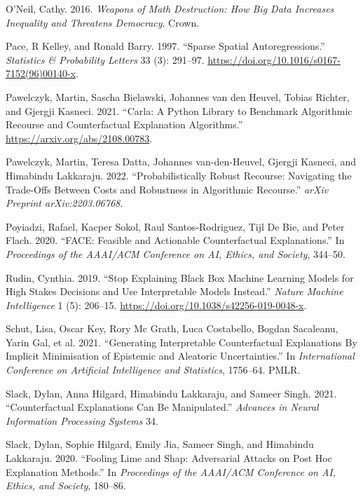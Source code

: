 \documentclass{juliacon}
\newlength{\cslhangindent}
\newenvironment{CSLReferences}[2] %
 {\begin{list}{}{%
  \setlength{\itemindent}{0pt}
  \setlength{\leftmargin}{0pt}
  \setlength{\parsep}{0pt}
  \ifodd #1
   \setlength{\leftmargin}{\cslhangindent}
   \setlength{\itemindent}{-1\cslhangindent}
  \fi
  \setlength{\itemsep}{#2\baselineskip}}}
 {\end{list}}
\begin{document}
\begin{CSLReferences}{1}{0}
O'Neil, Cathy. 2016. \emph{Weapons of Math Destruction: {How} Big Data
Increases Inequality and Threatens Democracy}. {Crown}.

Pace, R Kelley, and Ronald Barry. 1997. {``Sparse Spatial
Autoregressions.''} \emph{Statistics \& Probability Letters} 33 (3):
291--97. \url{https://doi.org/10.1016/s0167-7152(96)00140-x}.

Pawelczyk, Martin, Sascha Bielawski, Johannes van den Heuvel, Tobias
Richter, and Gjergji Kasneci. 2021. {``Carla: A Python Library to
Benchmark Algorithmic Recourse and Counterfactual Explanation
Algorithms.''} \url{https://arxiv.org/abs/2108.00783}.

Pawelczyk, Martin, Teresa Datta, Johannes van-den-Heuvel, Gjergji
Kasneci, and Himabindu Lakkaraju. 2022. {``Probabilistically {Robust}
{Recourse}: {Navigating} the {Trade}-Offs Between {Costs} and
{Robustness} in {Algorithmic} {Recourse}.''} \emph{arXiv Preprint
arXiv:2203.06768}.

Poyiadzi, Rafael, Kacper Sokol, Raul Santos-Rodriguez, Tijl De Bie, and
Peter Flach. 2020. {``{FACE}: {Feasible} and Actionable Counterfactual
Explanations.''} In \emph{Proceedings of the {AAAI}/{ACM Conference} on
{AI}, {Ethics}, and {Society}}, 344--50.

Rudin, Cynthia. 2019. {``Stop Explaining Black Box Machine Learning
Models for High Stakes Decisions and Use Interpretable Models
Instead.''} \emph{Nature Machine Intelligence} 1 (5): 206--15.
\url{https://doi.org/10.1038/s42256-019-0048-x}.

Schut, Lisa, Oscar Key, Rory Mc Grath, Luca Costabello, Bogdan
Sacaleanu, Yarin Gal, et al. 2021. {``Generating {Interpretable
Counterfactual Explanations By Implicit Minimisation} of {Epistemic} and
{Aleatoric Uncertainties}.''} In \emph{International {Conference} on
{Artificial Intelligence} and {Statistics}}, 1756--64. {PMLR}.

Slack, Dylan, Anna Hilgard, Himabindu Lakkaraju, and Sameer Singh. 2021.
{``Counterfactual Explanations Can Be Manipulated.''} \emph{Advances in
Neural Information Processing Systems} 34.

Slack, Dylan, Sophie Hilgard, Emily Jia, Sameer Singh, and Himabindu
Lakkaraju. 2020. {``Fooling Lime and Shap: {Adversarial} Attacks on Post
Hoc Explanation Methods.''} In \emph{Proceedings of the {AAAI}/{ACM
Conference} on {AI}, {Ethics}, and {Society}}, 180--86.


\end{CSLReferences}
\end{document}
